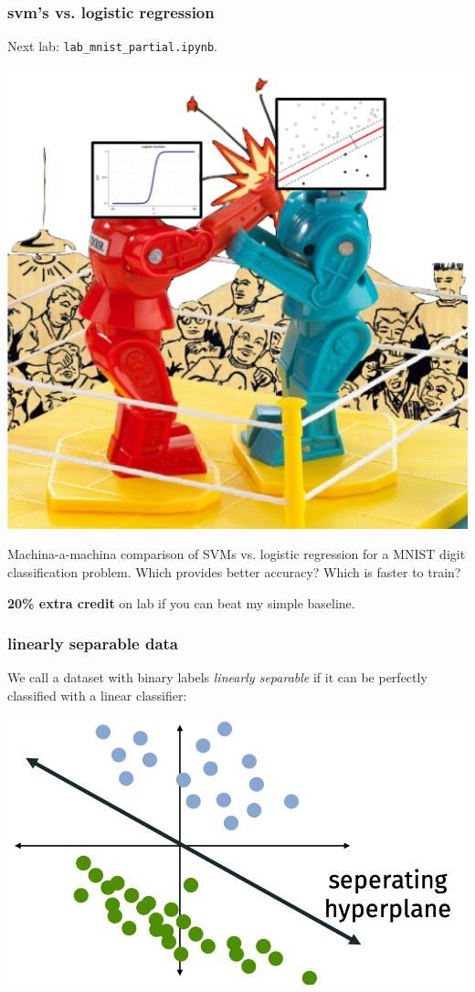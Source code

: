 \documentclass[handout,compress]{beamer}
\begin{document}
\begin{frame}
	\frametitle{svm's vs. logistic regression}
	\centering
	Next lab: \texttt{lab\_mnist\_partial.ipynb}. 
	\begin{center}
		\includegraphics[width=.4\textwidth]{faceoff.png}
	\end{center}
	Machina-a-machina comparison of SVMs vs. logistic regression for a MNIST digit classification problem. Which provides better accuracy? Which is faster to train? 
	
	\textbf{20\% extra credit} on lab if you can beat my simple baseline.
\end{frame}

\begin{frame}
	\frametitle{linearly separable data}
	We call a dataset with binary labels \emph{linearly separable} if it can be perfectly classified with a linear classifier:
	\begin{center}
		\includegraphics[width=.6\textwidth]{linearly_seperable.png}
	\end{center}
\end{frame}
\end{document}
